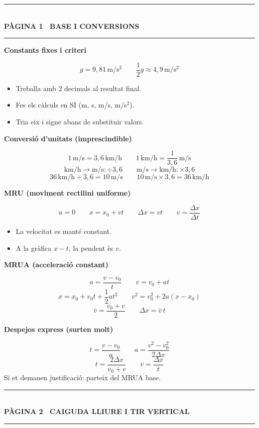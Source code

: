 \documentclass[10pt,a4paper]{extarticle}
\newcommand{\mainhead}[1]{%
	\vspace{0.10cm}
	{\color{accent}\rule{\linewidth}{0.9pt}}\\[-0.16cm]
	{\large\bfseries\color{ink} #1}\\[-0.10cm]
	{\color{accent}\rule{\linewidth}{0.55pt}}
	\vspace{0.08cm}
}
\newcommand{\subhead}[1]{%
	\vspace{0.08cm}
	\colorbox{subbg}{\parbox{\dimexpr\linewidth-2\fboxsep\relax}{\textbf{\color{ink}#1}}}
	\vspace{0.03cm}
}
\newcommand{\examnote}[1]{%
	{\small\color{muted}#1}
}
\begin{document}

\mainhead{P\`AGINA 1 \textbullet\ BASE I CONVERSIONS}

\subhead{Constants fixes i criteri}
\[
g=9{,}81\,\mathrm{m/s^2}
\qquad
\frac{1}{2}g\approx4{,}9\,\mathrm{m/s^2}
\]
\begin{itemize}
\item Treballa amb 2 decimals al resultat final.
\item Fes els c\`alculs en SI (m, s, m/s, m/s$^2$).
\item Tria eix i signe abans de substituir valors.
\end{itemize}

\subhead{Conversi\'o d'unitats (imprescindible)}
\[
1\,\mathrm{m/s}=3{,}6\,\mathrm{km/h}
\qquad
1\,\mathrm{km/h}=\frac{1}{3{,}6}\,\mathrm{m/s}
\]
\[
\mathrm{km/h}\rightarrow\mathrm{m/s}:\div 3{,}6
\qquad
\mathrm{m/s}\rightarrow\mathrm{km/h}:\times 3{,}6
\]
\[
36\,\mathrm{km/h}\div 3{,}6=10\,\mathrm{m/s}
\qquad
10\,\mathrm{m/s}\times 3{,}6=36\,\mathrm{km/h}
\]

\subhead{MRU (moviment rectilini uniforme)}
\[
a=0
\qquad
x=x_0+vt
\qquad
\Delta x=vt
\qquad
v=\frac{\Delta x}{\Delta t}
\]
\begin{itemize}
\item La velocitat es mant\'e constant.
\item A la gr\`afica $x-t$, la pendent \`es $v$.
\end{itemize}

\subhead{MRUA (acceleraci\'o constant)}
\[
a=\frac{v-v_0}{t}
\qquad
v=v_0+at
\]
\[
x=x_0+v_0t+\frac{1}{2}at^2
\qquad
v^2=v_0^2+2a(x-x_0)
\]
\[
\bar v=\frac{v_0+v}{2}
\qquad
\Delta x=\bar v\,t
\]

\subhead{Despejos express (surten molt)}
\[
t=\frac{v-v_0}{a}
\qquad
a=\frac{v^2-v_0^2}{2\Delta x}
\]
\[
t=\frac{2\Delta x}{v_0+v}
\qquad
v=\frac{\Delta x}{t}
\]
\examnote{Si et demanen justificaci\'o: parteix del MRUA base.}

\clearpage

\mainhead{P\`AGINA 2 \textbullet\ CAIGUDA LLIURE I TIR VERTICAL}
\end{document}
